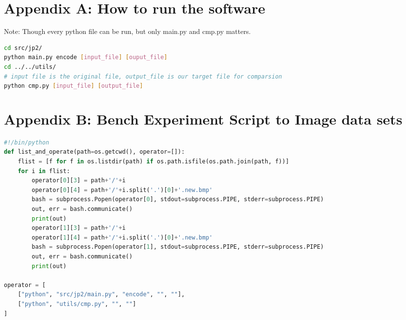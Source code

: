 \documentclass[UTF8, letterpaper, 14pt]{article}
\begin{document}
\section{Appendix A: How to run the software}
Note: Though every python file can be run, but only main.py and cmp.py matters.\\
\begin{spacing}{0.7}

\begin{lstlisting}[language=bash, breaklines=true]
cd src/jp2/
python main.py encode [input_file] [ouput_file]
cd ../../utils/
# input file is the original file, output_file is our target file for comparsion
python cmp.py [input_file] [output_file]
\end{lstlisting}
\end{spacing}
\section{Appendix B: Bench Experiment Script to Image data sets}
\begin{spacing}{0.7}

\begin{lstlisting}[language=python, breaklines=true]
#!/bin/python
def list_and_operate(path=os.getcwd(), operator=[]):
    flist = [f for f in os.listdir(path) if os.path.isfile(os.path.join(path, f))]
    for i in flist:
        operator[0][3] = path+'/'+i
        operator[0][4] = path+'/'+i.split('.')[0]+'.new.bmp'
        bash = subprocess.Popen(operator[0], stdout=subprocess.PIPE, stderr=subprocess.PIPE)
        out, err = bash.communicate()
        print(out)
        operator[1][3] = path+'/'+i
        operator[1][4] = path+'/'+i.split('.')[0]+'.new.bmp'
        bash = subprocess.Popen(operator[1], stdout=subprocess.PIPE, stderr=subprocess.PIPE)
        out, err = bash.communicate()
        print(out)

operator = [
	["python", "src/jp2/main.py", "encode", "", ""],
	["python", "utils/cmp.py", "", ""]
]
\end{lstlisting}
\end{spacing}
\end{document}
